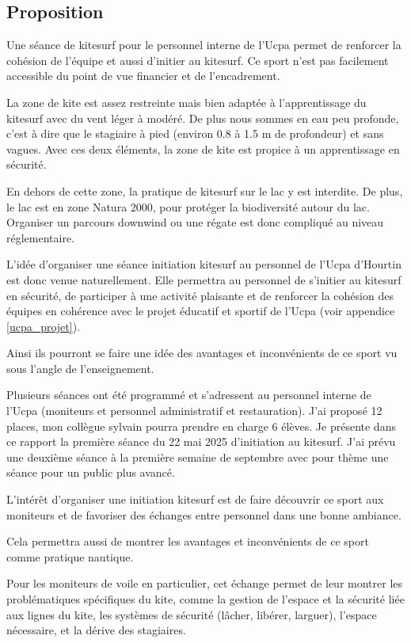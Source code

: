 \documentclass[11pt,a4paper]{report}
\begin{document}
\subsection{Proposition}

Une séance de kitesurf pour le personnel interne de l'Ucpa 
permet de renforcer la cohésion de l'équipe et aussi d'initier au kitesurf.
Ce sport n'est pas facilement  accessible du point de vue financier et
de l'encadrement.

La zone de kite est assez restreinte mais bien adaptée à l'apprentissage
du kitesurf avec du vent léger à modéré. De plus nous sommes en 
eau peu profonde, c'est à dire que le stagiaire à pied (environ 0.8 à 1.5 m
de profondeur) et sans vagues. Avec ces deux éléments, la zone de kite 
est propice à un apprentissage en sécurité.

En dehors de cette zone, la pratique de kitesurf sur le lac
y est interdite. De plus, le lac est en zone Natura 2000\cite{natura2000}, pour
protéger la biodiversité autour du lac.
Organiser un parcours downwind ou une régate est donc compliqué
au niveau réglementaire.

L'idée d'organiser une séance initiation kitesurf
au personnel de l'Ucpa d'Hourtin est donc venue naturellement.
Elle permettra au personnel de s'initier au kitesurf en 
sécurité, de participer à une activité plaisante
et de renforcer la cohésion des équipes en cohérence avec le 
projet éducatif et sportif de l'Ucpa (voir appendice \ref{ucpa_projet}).

Ainsi ils pourront se faire une idée des avantages et
inconvénients de ce sport vu sous l'angle de l'enseignement.

Plusieurs séances ont été programmé et s'adressent au personnel 
interne de l'Ucpa (moniteurs et personnel administratif et
restauration). J'ai  proposé 12 places, mon collègue sylvain
pourra prendre en charge 6 élèves.
Je présente dans ce rapport la première séance du 22 mai 2025 d'initiation 
au kitesurf. J'ai prévu une deuxième séance à la première semaine de
septembre avec pour thème une séance pour un public plus avancé.

L'intér\^et d'organiser une initiation kitesurf est de faire découvrir ce
sport aux moniteurs et de favoriser des échanges entre personnel dans 
une bonne ambiance.

Cela permettra aussi de montrer les avantages
et inconvénients de ce sport comme pratique nautique. 

Pour les moniteurs de voile en particulier, cet échange permet
de leur montrer les problématiques spécifiques du kite, 
comme la gestion de l'espace et la sécurité liée aux lignes du kite, 
les  systèmes de sécurité 
(lâcher, libérer, larguer), l'espace nécessaire, et la dérive
des stagiaires.
\end{document}
